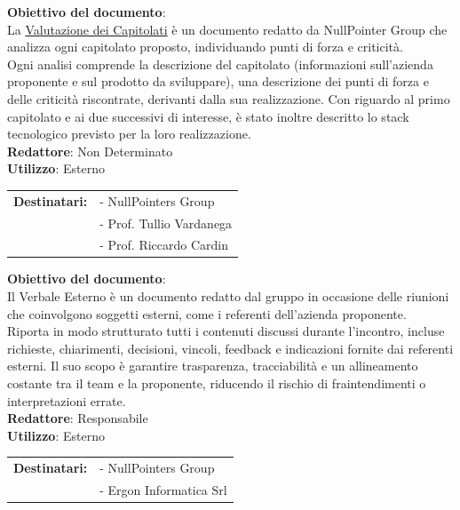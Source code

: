 	\textbf{Obiettivo del documento}:\\
	La \href{https://nullpointersgroup.github.io/Documentazione/output/Candidatura/Valutazione_Capitolati.pdf}{Valutazione dei Capitolati} è un documento redatto da NullPointer Group che analizza ogni capitolato proposto, individuando punti di forza e criticità.\\
	Ogni analisi comprende la descrizione del capitolato (informazioni sull’azienda proponente e sul prodotto da sviluppare), una descrizione dei punti di forza e delle criticità riscontrate, derivanti dalla sua realizzazione. Con riguardo al primo capitolato e ai due successivi di interesse, è stato inoltre descritto lo stack tecnologico previsto per la loro realizzazione.\\[0.5em]
	\medskip
	\textbf{Redattore}: Non Determinato\\
	\medskip
	\textbf{Utilizzo}: Esterno\\
	\medskip 
	\begin{tabular}{@{}l l}
		\textbf{Destinatari:} & - NullPointers Group\\
		                      & - Prof. Tullio Vardanega\\
							  & - Prof. Riccardo Cardin
	\end{tabular}

	\textbf{Obiettivo del documento}:\\
	Il Verbale Esterno è un documento redatto dal gruppo in occasione delle riunioni che coinvolgono soggetti esterni, come i referenti dell’azienda proponente.\\
	Riporta in modo strutturato tutti i contenuti discussi durante l’incontro, incluse richieste, chiarimenti, decisioni, vincoli, feedback e indicazioni fornite dai referenti esterni. Il suo scopo è garantire trasparenza, tracciabilità e un allineamento costante tra il team e la proponente, riducendo il rischio di fraintendimenti o interpretazioni errate.\\[0.5em]
	\medskip
	\textbf{Redattore}: Responsabile\\
	\medskip
	\textbf{Utilizzo}: Esterno\\
	\medskip 
	\begin{tabular}{@{}l l}
		\textbf{Destinatari:} & - NullPointers Group\\
		                      & - Ergon Informatica Srl
	\end{tabular}

